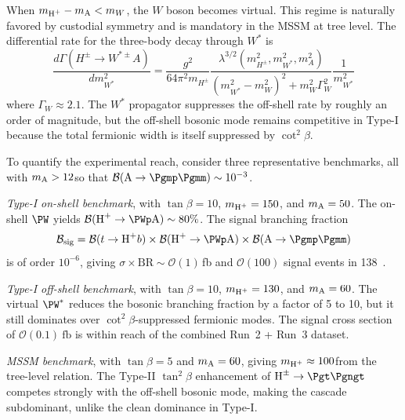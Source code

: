 When $m_{\text{H}^+} - m_{\text{A}} < m_W$, the $W$ boson becomes virtual. This regime is naturally favored by custodial symmetry and is mandatory in the MSSM at tree level. The differential rate for the three-body decay through $W^*$ is~\cite{Eriksson:2009ws}
\begin{equation}
\frac{d\Gamma(H^\pm \to W^{*\pm} A)}{dm_{W^*}^2} = \frac{g^2}{64\pi^2 m_{H^\pm}} \frac{\lambda^{3/2}(m_{H^\pm}^2, m_{W^*}^2, m_A^2)}{(m_{W^*}^2 - m_W^2)^2 + m_W^2 \Gamma_W^2} \frac{1}{m_{W^*}^2}
\label{eq:dGamma_Hpm_WstarA}
\end{equation}
where $\Gamma_W \approx 2.1$\GeV. The $W^*$ propagator suppresses the off-shell rate by roughly an order of magnitude, but the off-shell bosonic mode remains competitive in Type-I because the total fermionic width is itself suppressed by $\cot^2\beta$.

To quantify the experimental reach, consider three representative benchmarks, all with $m_{\text{A}} > 12$\GeV so that $\mathcal{B}(\PA \to \Pgmp\Pgmm) \sim 10^{-3}$.

\emph{Type-I on-shell benchmark}, with $\tan\beta = 10$, $m_{\text{H}^+} = 150$\GeV, and $m_{\text{A}} = 50$\GeV. The on-shell $\PW$ yields $\mathcal{B}(\PHp \to \PWp \PA) \sim 80\%$. The signal branching fraction
\begin{equation}
\mathcal{B}_{\text{sig}} = \mathcal{B}(t \to \PHp b) \times \mathcal{B}(\PHp \to \PWp \PA) \times \mathcal{B}(\PA \to \Pgmp\Pgmm)
\label{eq:sig_BR}
\end{equation}
is of order $10^{-6}$, giving $\sigma \times \text{BR} \sim \mathcal{O}(1)$\,fb and $\mathcal{O}(100)$ signal events in 138~\fbinv.

\emph{Type-I off-shell benchmark}, with $\tan\beta = 10$, $m_{\text{H}^+} = 130$\GeV, and $m_{\text{A}} = 60$\GeV. The virtual $\PW^*$ reduces the bosonic branching fraction by a factor of 5 to 10, but it still dominates over $\cot^2\beta$-suppressed fermionic modes. The signal cross section of $\mathcal{O}(0.1)~\text{fb}$ is within reach of the combined Run~2 + Run~3 dataset.

\emph{MSSM benchmark}, with $\tan\beta = 5$ and $m_{\text{A}} = 60$\GeV, giving $m_{\text{H}^+} \approx 100$\GeV from the tree-level relation. The Type-II $\tan^2\beta$ enhancement of $\PHc \to \Pgt\Pgngt$ competes strongly with the off-shell bosonic mode, making the cascade subdominant, unlike the clean dominance in Type-I.

